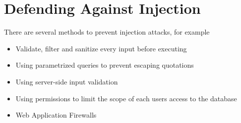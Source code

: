 \section*{Defending Against Injection}

There are several methods to prevent injection attacks, for example
\begin{itemize}
  \item Validate, filter and sanitize every input before executing
  \item Using parametrized queries to prevent escaping quotations
  \item Using server-side input validation
  \item Using permissions to limit the scope of each users access to the database
  \item Web Application Firewalls
\end{itemize}